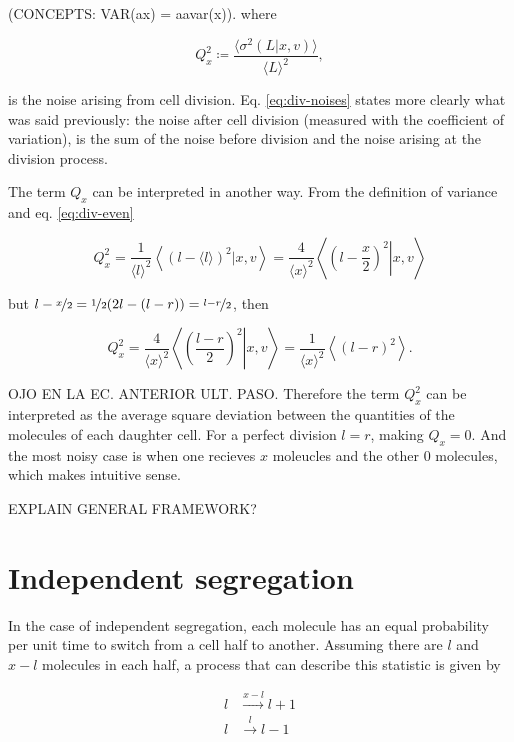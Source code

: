 (CONCEPTS: VAR(ax) = aavar(x)). where

\begin{equation}
  \label{eq:div-Q}
  Q_x^2 \coloneqq \frac{\langle\sigma^2(L|x,v)\rangle}{\langle L\rangle^2},
\end{equation}

is the noise arising from cell division. Eq. \eqref{eq:div-noises} states more clearly what was said previously: the noise after cell division (measured with the coefficient of variation), is the sum of the noise before division and the noise arising at the division process.

The term $Q_x$ can be interpreted in another way. From the definition of variance and eq. \eqref{eq:div-even}

\begin{equation}
  Q_x^2 = \frac{1}{\langle l\rangle^2}\left\langle\left(l-\langle l\rangle\right)^2|x,v\right\rangle = \frac{4}{\langle x\rangle^2}\left\langle\left.\left(l-\frac{x}{2}\right)^2\right|x,v\right\rangle
\end{equation}

but $l - \nicefrac{x}{2} = \nicefrac{1}{2}(2l-(l-r)) = \nicefrac{l-r}{2}$, then

\begin{equation}
   Q_x^2 = \frac{4}{\langle x\rangle^2}\left\langle\left.\left(\frac{l-r}{2}\right)^2\right|x,v\right\rangle  = \frac{1}{\langle x\rangle^2}\left\langle\left(l-r\right)^2\right\rangle.
\end{equation}

OJO EN LA EC. ANTERIOR ULT. PASO. Therefore the term $Q_x^2$ can be interpreted as the average square deviation between the quantities of the molecules of each daughter cell. For a perfect division $l=r$, making $Q_x=0$. And the most noisy case is when one recieves $x$ moleucles and the other $0$ molecules, which makes intuitive sense.

EXPLAIN GENERAL FRAMEWORK?

\section{Independent segregation}

In the case of independent segregation, each molecule has an equal probability per unit time to switch from a cell half to another. Assuming there are $l$ and $x-l$ molecules in each half, a process that can describe this statistic is given by

\begin{equation}
  \label{eq:div-arr_ind}
  \begin{split}
    l&\xrightarrow{x-l}l+1\\
    l&\xrightarrow{l}l-1
  \end{split}
\end{equation}

